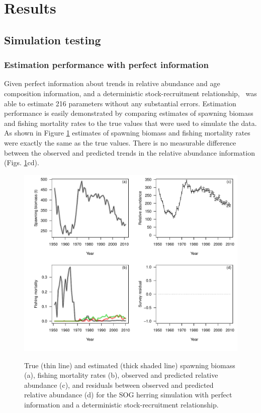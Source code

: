 \section{Results}
	\subsection{Simulation testing}
		\subsubsection{Estimation performance with perfect information}
	
	Given perfect information about trends in relative abundance and age composition information, and a deterministic stock-recruitment relationship, \iscam\ was able to estimate 216 parameters without any substantial errors.	  Estimation performance is easily demonstrated by comparing estimates of spawning biomass and fishing mortality rates to the true values that were used to simulate the data.  As shown in Figure \ref{FigSimPlot} estimates of spawning biomass and fishing mortality rates were exactly the same as the true values. There is no measurable difference between the observed and predicted trends in the relative abundance information (Figs. \ref{FigSimPlot}cd).
	
\begin{figure}[!tbp]
	\includegraphics[width=\textwidth]{Figs/simPlot.pdf}\\
	\caption{True (thin line) and estimated (thick shaded line) spawning biomass (a), fishing mortality rates (b), observed and predicted relative abundance (c), and residuals between observed and predicted relative abundance (d) for the SOG herring simulation with perfect information and a deterministic stock-recruitment relationship.}\label{FigSimPlot}
\end{figure}
		
